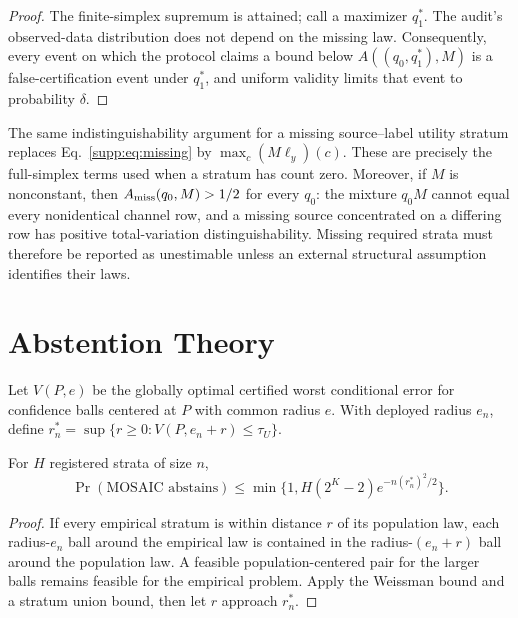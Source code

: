 \begin{proof}
The finite-simplex supremum is attained; call a maximizer $q_1^*$. The audit's
observed-data distribution does not depend on the missing law. Consequently,
every event on which the protocol claims a bound below
$A((q_0,q_1^*),M)$ is a false-certification event under $q_1^*$, and uniform
validity limits that event to probability $\delta$.
\end{proof}

The same indistinguishability argument for a missing source--label utility
stratum replaces Eq.~\eqref{supp:eq:missing} by
$\max_c(M\ell_y)(c)$. These are precisely the full-simplex terms used when a
stratum has count zero. Moreover, if $M$ is nonconstant, then
$A_{\rm miss}(q_0,M)>1/2$ for every $q_0$: the mixture $q_0M$ cannot equal every
nonidentical channel row, and a missing source concentrated on a differing row
has positive total-variation distinguishability. Missing required strata must
therefore be reported as unestimable unless an external structural assumption
identifies their laws.

\section{Abstention Theory}

Let $V(P,e)$ be the globally optimal certified worst conditional error for
confidence balls centered at $P$ with common radius $e$. With deployed radius
$e_n$, define
$r_n^*=\sup\{r\geq0:V(P,e_n+r)\leq\tau_U\}$.

\begin{proposition}
For $H$ registered strata of size $n$,
\begin{equation}
 \Pr(\text{MOSAIC abstains})\leq
 \min\{1,H(2^K-2)e^{-n(r_n^*)^2/2}\}.
 \label{supp:eq:abstain}
\end{equation}
\end{proposition}

\begin{proof}
If every empirical stratum is within distance $r$ of its population law, each
radius-$e_n$ ball around the empirical law is contained in the
radius-$(e_n+r)$ ball around the population law. A feasible population-centered
pair for the larger balls remains feasible for the empirical problem. Apply
the Weissman bound and a stratum union bound, then let $r$ approach $r_n^*$.
\end{proof}

